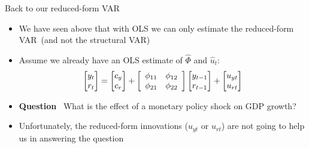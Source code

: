\documentclass[10pt,handout]{beamer}
\begin{document}
\begin{frame}
{Back to our reduced-form VAR}
\begin{itemize}
\item We have seen above that with OLS we can only estimate the reduced-form VAR\ (and not the structural VAR) \bigskip
\item Assume we already have an OLS estimate of $\hat{\Phi}$ and $\hat{u}_{t} $:%
\begin{equation*}
\begin{bmatrix}
y_{t} \\ 
r_{t}%
\end{bmatrix}%
=
\begin{bmatrix}
c_{y} \\
c_{r}%
\end{bmatrix}%
+%
\left[ 
\begin{array}{cc}
\phi _{11} & \phi _{12} \\ 
\phi _{21} & \phi _{22}%
\end{array}%
\right] 
\begin{bmatrix}
y_{t-1} \\ 
r_{t-1}%
\end{bmatrix}%
+%
\begin{bmatrix}
u_{yt}\\ 
u_{rt}%
\end{bmatrix}%
\medskip
\end{equation*}%
\pause
\item \textbf{Question} \ What is the effect of a monetary policy shock on GDP growth?\bigskip\pause
\item Unfortunately, the reduced-form innovations ($u_{yt}$ or $u_{rt}$) are not going to help us in answering the question
\end{itemize}
\end{frame}
\shownotesblock{}
\end{document}
